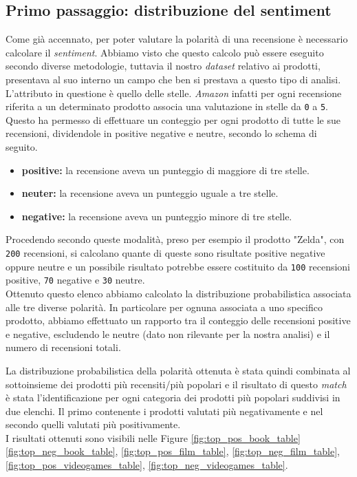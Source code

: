 		\subsection{Primo passaggio: distribuzione del sentiment}
			Come già accennato, per poter valutare la polarità di una recensione è necessario calcolare il \textit{sentiment}. Abbiamo visto che questo calcolo può essere eseguito secondo diverse metodologie, tuttavia il nostro \textit{dataset} relativo ai prodotti, presentava al suo interno un campo che ben si prestava a questo tipo di analisi. L'attributo in questione è quello delle stelle. \textit{Amazon} infatti per ogni recensione riferita a un determinato prodotto associa una valutazione in stelle da \verb|0| a \verb|5|. Questo ha permesso di effettuare un conteggio per ogni prodotto di tutte le sue recensioni, dividendole in positive negative e neutre, secondo lo schema di seguito.
			
			\begin{itemize}
				\item \textbf{positive:} la recensione aveva un punteggio di maggiore di tre stelle.
				\item \textbf{neuter:} la recensione aveva un punteggio uguale a tre stelle.
				\item \textbf{negative:} la recensione aveva un punteggio minore di tre stelle.
			\end{itemize}
			
			Procedendo secondo queste modalità, preso per esempio il prodotto "Zelda", con \verb|200| recensioni, si calcolano quante di queste sono risultate positive negative oppure neutre e un possibile risultato potrebbe essere costituito da \verb|100| recensioni positive, \verb|70| negative e \verb|30| neutre. \\		
			Ottenuto questo elenco abbiamo calcolato la distribuzione probabilistica associata alle tre diverse polarità. In particolare per ognuna associata a uno specifico prodotto, abbiamo effettuato un rapporto tra il conteggio delle recensioni positive e negative, escludendo le neutre (dato non rilevante per la nostra analisi) e il numero di recensioni totali. 
			
			La distribuzione probabilistica della polarità ottenuta è stata quindi combinata al sottoinsieme dei prodotti più recensiti/più popolari e il risultato di questo \textit{match} è stata l'identificazione per ogni categoria dei prodotti più popolari suddivisi in due elenchi. Il primo contenente i prodotti valutati più negativamente e nel secondo quelli valutati più positivamente. \\
			I risultati ottenuti sono visibili nelle Figure \ref{fig:top_pos_book_table} \ref{fig:top_neg_book_table}, \ref{fig:top_pos_film_table}, \ref{fig:top_neg_film_table}, \ref{fig:top_pos_videogames_table}, \ref{fig:top_neg_videogames_table}.
			
